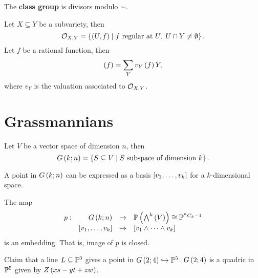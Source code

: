 \begin{definition}
The \textbf{class group} is divisors modulo $ \sim $.
\end{definition}

\begin{definition}
Let $ X \subseteq Y $ be a subvariety, then
$$ \OO_{X, Y} = \cb{\rb{U, f} \mid f \ \text{regular at} \ U, \ U \cap Y \ne \emptyset}. $$
Let $ f $ be a rational function, then
$$ \rb{f} = \sum_Y v_Y\rb{f}Y, $$
where $ v_Y $ is the valuation associated to $ \OO_{X, Y} $.
\end{definition}

\pagebreak

\section{Grassmannians}

\begin{definition}
Let $ V $ be a vector space of dimension $ n $, then
$$ G\rb{k; n} = \cb{S \subseteq V \mid S \ \text{subspace of dimension} \ k}. $$
\end{definition}

\begin{remark*}
A point in $ G\rb{k; n} $ can be expressed as a basis $ \sb{v_1, \dots, v_k} $ for a $ k $-dimensional space.
\end{remark*}

\begin{theorem}
The map
$$ \function[p]{G\rb{k; n}}{\P\rb{\bigwedge^k\rb{V}} \cong \P^{^nC_k - 1}}{\sb{v_1, \dots, v_k}}{\sb{v_1 \wedge \dots \wedge v_k}} $$
is an embedding. That is, image of $ p $ is closed.
\end{theorem}

\begin{example*}
Claim that a line $ L \subseteq \P^3 $ gives a point in $ G\rb{2; 4} \hookrightarrow \P^5 $. $ G\rb{2; 4} $ is a quadric in $ \P^5 $ given by $ Z\rb{xs - yt + zw} $.
\end{example*}

